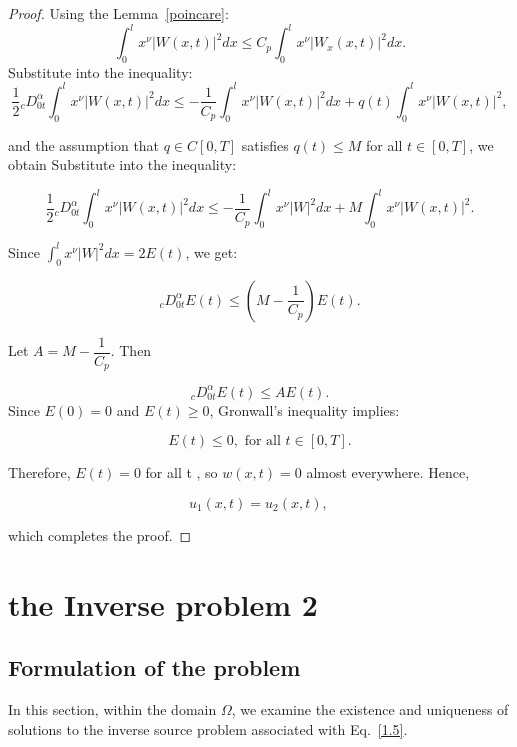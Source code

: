 \documentclass[reqno]{amsart}
\theoremstyle{definition}
\numberwithin{equation}{section}
\begin{document}
\begin{proof}
Using the Lemma~\ref{poincare}: 
\begin{equation*}
    \int_0^l x^{\nu}|W(x,t)|^2dx\leq C_p\int_0^l x^{\nu}|W_x(x,t)|^2dx.
\end{equation*}
Substitute into the inequality:
\begin{equation*}
    \frac{1}{2} {_c}D_{0t}^{\alpha}\int_0^lx^{\nu}|W(x,t)|^2dx\le-\frac{1}{C _p}\int_0^lx^{\nu}\left|W(x,t)\right|^2dx+q(t)\int_0^lx^{\nu}|W(x,t)|^2,
\end{equation*}

and the assumption that 
$q \in C[0,T]$ satisfies $q(t)\le M$ for all $t\in[0,T]$, we obtain
Substitute into the inequality:

\begin{equation*}
    \frac{1}{2} {_c}D_{0t}^{\alpha}\int_0^lx^{\nu}|W(x,t)|^2dx\leq-\frac{1}{C _p} \int_0^l x^\nu|W|^2 d x +M\int_0^lx^{\nu}|W(x,t)|^2.
\end{equation*}


Since $\int_0^lx^{\nu}|W|^2 d x=2 E(t)$, we get:

\begin{equation*}
    _cD_{0t}^{\alpha}E(t)\leq \left(M-\frac{1}{C _p}\right)E(t).
\end{equation*}


Let $A=M-\dfrac{1}{C _p}$. Then

\begin{equation*}
    _cD_{0t}^{\alpha}E(t) \leq A E(t).
\end{equation*}
Since $E(0)=0$ and $E(t) \geq 0$, Gronwall's inequality implies:

$$
E(t) \leq 0, \text { for all } t \in[0, T] .
$$


Therefore, $E(t)=0$ for all t , so $w(x, t)=0$ almost everywhere. Hence,

$$
u_1(x, t)=u_2(x, t) \text {, }
$$

which completes the proof.

\end{proof}




\section{ the Inverse problem 2 }
\subsection{Formulation of the problem}
In this section, within the domain $\Omega$, we examine the existence and uniqueness of solutions to the inverse source problem associated with Eq.~\eqref{1.5}.
\end{document}
